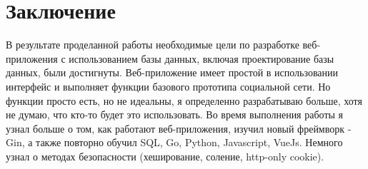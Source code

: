 \chapter*{Заключение}

В результате проделанной работы необходимые цели по разработке веб-приложения с использованием базы данных, включая проектирование базы данных, были достигнуты.
Веб-приложение имеет простой в использовании интерфейс и выполняет функции базового прототипа социальной сети.
Но функции просто есть, но не идеальны, я определенно разрабатываю больше, хотя не думаю, что кто-то будет это использовать.
Во время выполнения работы я узнал больше о том, как работают веб-приложения, изучил новый фреймворк - Gin, а также повторно обучил SQL, Go, Python, Javascript, VueJs. Немного узнал о методах безопасности (хеширование, соление, http-only cookie).
